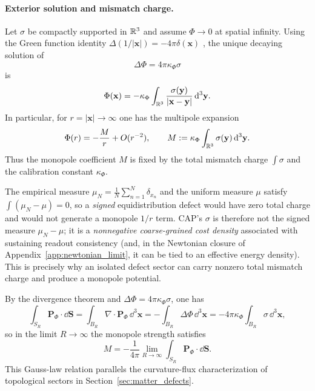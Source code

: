 \paragraph{Exterior solution and mismatch charge.}
Let $\sigma$ be compactly supported in $\mathbb{R}^3$ and assume $\Phi\to 0$ at spatial infinity. Using the Green function identity $\Delta(1/|\mathbf{x}|)=-4\pi\delta(\mathbf{x})$ \cite{ArfkenWeberHarris2013}, the unique decaying solution of
\begin{equation}
  \Delta\Phi = 4\pi \kappa_\Phi \sigma
\end{equation}
is
\begin{equation}
  \Phi(\mathbf{x})
  = -\kappa_\Phi\int_{\mathbb{R}^3}\frac{\sigma(\mathbf{y})}{|\mathbf{x}-\mathbf{y}|}\,\mathrm{d}^3\mathbf{y}.
\end{equation}
In particular, for $r=|\mathbf{x}|\to\infty$ one has the multipole expansion
\begin{equation}
  \Phi(r)
  = -\frac{M}{r} + O(r^{-2}),
  \qquad
  M := \kappa_\Phi \int_{\mathbb{R}^3}\sigma(\mathbf{y})\,\mathrm{d}^3\mathbf{y}.
\end{equation}
Thus the monopole coefficient $M$ is fixed by the total mismatch charge $\int\sigma$ and the calibration constant $\kappa_\Phi$.

\begin{remark}
The empirical measure $\mu_N=\frac1N\sum_{n=1}^N \delta_{x_n}$ and the uniform measure $\mu$ satisfy $\int(\mu_N-\mu)=0$, so a \emph{signed} equidistribution defect would have zero total charge and would not generate a monopole $1/r$ term. CAP's $\sigma$ is therefore not the signed measure $\mu_N-\mu$; it is a \emph{nonnegative coarse-grained cost density} associated with sustaining readout consistency (and, in the Newtonian closure of Appendix~\ref{app:newtonian_limit}, it can be tied to an effective energy density). This is precisely why an isolated defect sector can carry nonzero total mismatch charge and produce a monopole potential.
\end{remark}

\begin{remark}
By the divergence theorem and $\Delta\Phi=4\pi\kappa_\Phi\sigma$, one has
\begin{equation}
  \int_{S_R}\mathbf{P}_\Phi\cdot \dd\mathbf{S}
  = \int_{B_R}\nabla\cdot \mathbf{P}_\Phi\,\dd^3\mathbf{x}
  = -\int_{B_R}\Delta\Phi\,\dd^3\mathbf{x}
  = -4\pi \kappa_\Phi \int_{B_R}\sigma\,\dd^3\mathbf{x},
\end{equation}
so in the limit $R\to\infty$ the monopole strength satisfies
\begin{equation}
  M = -\frac{1}{4\pi}\lim_{R\to\infty}\int_{S_R}\mathbf{P}_\Phi\cdot \dd\mathbf{S}.
\end{equation}
This Gauss-law relation parallels the curvature-flux characterization of topological sectors in Section~\ref{sec:matter_defects}.
\end{remark}

